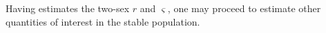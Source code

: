 
Having estimates the two-sex $r$ and $\varsigma$, one may proceed to estimate
other quantities of interest in the stable population.



